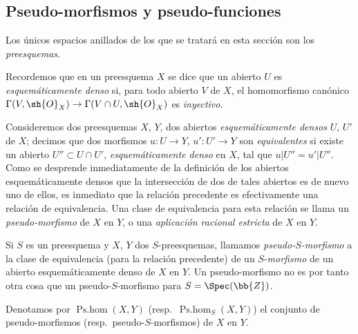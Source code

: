 \subsection{Pseudo-morfismos y pseudo-funciones}
\label{IV.20.2}

Los únicos espacios anillados de los que se tratará en esta sección son los \emph{preesquemas}.

\begin{env}[20.2.1]
\label{IV.20.2.1}
Recordemos  que en un preesquema $X$ se dice que un abierto $U$ es \emph{esquemáticamente denso} si, para todo abierto $V$ de $X$, el homomorfismo canónico $\Gamma(V,\sh{O}_X)\to\Gamma(V\cap U,\sh{O}_X)$ es \emph{inyectivo}.

Consideremos dos preesquemas $X$, $Y$, dos abiertos \emph{esquemáticamente densos} $U$, $U'$ de $X$; decimos que dos morfismos $u:U\to Y$, $u':U'\to Y$ son \emph{equivalentes} si existe un abierto $U''\subset U\cap U'$, \emph{esquemáticamente denso} en $X$, tal que $u|U''=u'|U''$.
Como se desprende inmediatamente de la definición de los abiertos esquemáticamente densos que la intersección de dos de tales abiertos es de nuevo uno de ellos, es inmediato que la relación precedente es efectivamente una relación de equivalencia.
Una clase de equivalencia para esta relación se llama un \emph{pseudo-morfismo} de $X$ en $Y$, o una \emph{aplicación racional estricta} de $X$ en $Y$.

Si $S$ es un preesquema y $X$, $Y$ dos $S$-preesquemas, llamamos \emph{pseudo-$S$-morfismo} a la clase de equivalencia (para la relación precedente) de un $S$-\emph{morfismo} de un abierto esquemáticamente denso de $X$ en $Y$.
Un pseudo-morfismo no es por tanto otra cosa que un pseudo-$S$-morfismo para $S=\Spec(\bb{Z})$.

Denotamos por $\operatorname{Ps.hom}(X,Y)$ (resp.\ $\operatorname{Ps.hom}_S(X,Y)$) el conjunto de pseudo-morfismos (resp.\ pseudo-$S$-morfismos) de $X$ en $Y$.
\end{env}

